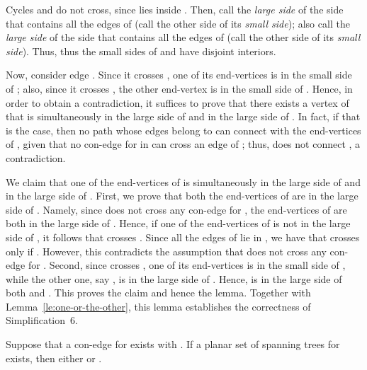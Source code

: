 \documentclass[letter,runningheads]{llncs}
\renewenvironment{proof}
{{\em Proof.\ }}{\hspace*{\fill}\par\vspace{2mm}}
\begin{document}
\begin{proof}
Cycles  and  do not cross, since  lies inside . Then, call the {\em large side} of  the side that contains all the edges of  (call the other side of  its {\em small side}); also call the {\em large side} of  the side that contains all the edges of  (call the other side of  its {\em small side}). Thus, thus the small sides of  and  have disjoint interiors.

Now, consider edge . Since it crosses , one of its end-vertices is in the small side of ; also, since it crosses , the other end-vertex is in the small side of . Hence, in order to obtain a contradiction, it suffices to prove that there exists a vertex  of  that is simultaneously in the large side of  and in the large side of . In fact, if that is the case, then no path whose edges belong to  can connect  with the end-vertices of , given that no con-edge for  in  can cross an edge of ; thus,  does not connect , a contradiction.

We claim that one of the end-vertices of  is simultaneously in the large side of  and in the large side of . First, we prove that both the end-vertices of  are in the large side of . Namely, since  does not cross any con-edge for , the end-vertices of  are both in the large side of . Hence, if one of the end-vertices of  is not in the large side of , it follows that  crosses . Since all the edges of  lie in , we have that  crosses  only if . However, this contradicts the assumption that  does not cross any con-edge for . Second, since  crosses , one of its end-vertices is in the small side of , while the other one, say , is in the large side of . Hence,  is in the large side of both  and . This proves the claim and hence the lemma. Together with Lemma~\ref{le:one-or-the-other}, this lemma establishes the correctness of {\sc Simplification~6}.
\end{proof}



\begin{lemma}[{\sc Simplification 7}]\label{le:non-isomorphic-sameT1}
Suppose that a con-edge  for  exists with . If a planar set  of spanning trees for  exists, then either  or .
\end{lemma}
\end{document}
